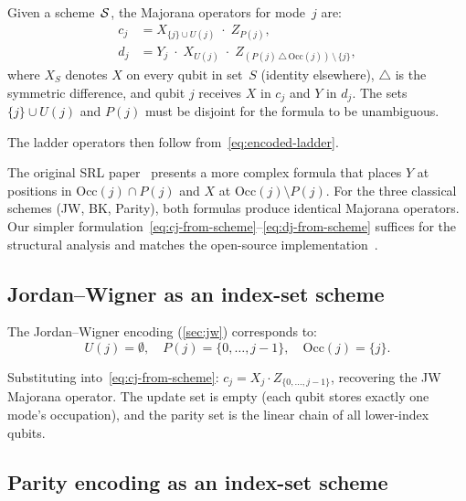 Given a scheme~$\mathcal{S}$, the Majorana operators for mode~$j$ are:
\begin{align}
  c_j &= X_{\{j\} \cup U(j)} \;\cdot\; Z_{P(j)},
  \label{eq:cj-from-scheme} \\[4pt]
  d_j &= Y_j \;\cdot\; X_{U(j)} \;\cdot\;
    Z_{(P(j)\,\triangle\,\mathrm{Occ}(j))\,\setminus\,\{j\}},
  \label{eq:dj-from-scheme}
\end{align}
where $X_S$ denotes $X$ on every qubit in set~$S$ (identity elsewhere),
$\triangle$ is the symmetric difference, and qubit $j$ receives $X$
in $c_j$ and $Y$ in $d_j$.  The sets $\{j\} \cup U(j)$ and $P(j)$
must be disjoint for the formula to be unambiguous.

The ladder operators then follow from~\eqref{eq:encoded-ladder}.

\begin{remark}
\label{rem:srl-formula}
The original SRL paper~\cite{seeley2012} presents a more complex
formula that places $Y$ at positions in $\mathrm{Occ}(j) \cap P(j)$
and $X$ at $\mathrm{Occ}(j) \setminus P(j)$.  For the three classical
schemes (JW, BK, Parity), both formulas produce identical Majorana
operators.  Our simpler
formulation~\eqref{eq:cj-from-scheme}--\eqref{eq:dj-from-scheme}
suffices for the structural analysis and matches the open-source
implementation~\cite{fockmap2026}.
\end{remark}

\subsection{Jordan--Wigner as an index-set scheme}
\label{sec:jw-as-scheme}

The Jordan--Wigner encoding (\cref{sec:jw}) corresponds to:
\begin{equation}
  U(j) = \emptyset, \quad
  P(j) = \{0, \ldots, j{-}1\}, \quad
  \mathrm{Occ}(j) = \{j\}.
  \label{eq:jw-sets}
\end{equation}

Substituting into~\eqref{eq:cj-from-scheme}:
$c_j = X_j \cdot Z_{\{0,\ldots,j-1\}}$, recovering the JW Majorana
operator.  The update set is empty (each qubit stores exactly one
mode's occupation), and the parity set is the linear chain of all
lower-index qubits.

\subsection{Parity encoding as an index-set scheme}
\label{sec:parity-as-scheme}

